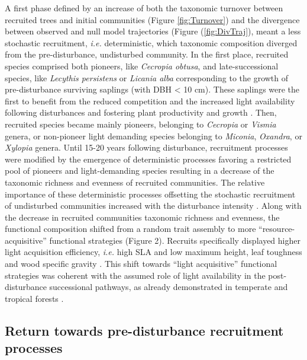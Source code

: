 \documentclass[fleqn,10pt]{ArtEcoFoG} %
\begin{document}
A first phase defined by an increase of both the taxonomic turnover between recruited trees and initial communities (Figure \ref{fig:Turnover}) and the divergence between observed and null model trajectories (Figure (\ref{fig:DivTraj}), meant a less stochastic recruitment, \emph{i.e.} deterministic, which taxonomic composition diverged from the pre-disturbance, undisturbed community.
In the first place, recruited species comprised both pioneers, like \emph{Cecropia obtusa}, and late-successional species, like \emph{Lecythis persistens} or \emph{Licania alba} corresponding to the growth of pre-disturbance surviving saplings (with DBH \textless{} 10 cm).
These saplings were the first to benefit from the reduced competition and the increased light availability following disturbances and fostering plant productivity and growth \citep{Monteith1972, Chazdon1984}.
Then, recruited species became mainly pioneers, belonging to \emph{Cecropia} or \emph{Vismia} genera, or non-pioneer light demanding species belonging to \emph{Miconia}, \emph{Oxandra}, or \emph{Xylopia} genera.
Until 15-20 years following disturbance, recruitment processes were modified by the emergence of deterministic processes favoring a restricted pool of pioneers and light-demanding species resulting in a decrease of the taxonomic richness and evenness of recruited communities.
The relative importance of these deterministic processes offsetting the stochastic recruitment of undisturbed communities increased with the disturbance intensity \citep{Bongers2009}.
Along with the decrease in recruited communities taxonomic richness and evenness, the functional composition shifted from a random trait assembly to more ``resource-acquisitive'' functional strategies (Figure 2).
Recruits specifically displayed higher light acquisition efficiency, \emph{i.e.} high SLA and low maximum height, leaf toughness and wood specific gravity \citep{Wright2004, Chave2009b, Herault2011}.
This shift towards ``light acquisitive'' functional strategies was coherent with the assumed role of light availability in the post-disturbance successional pathways, as already demonstrated in temperate and tropical forests \citep{Pena2008, Carreno2012, Kunstler2016, Both2019}.

\hypertarget{return-towards-pre-disturbance-recruitment-processes}{%
\subsection{Return towards pre-disturbance recruitment processes}\label{return-towards-pre-disturbance-recruitment-processes}}
\end{document}

